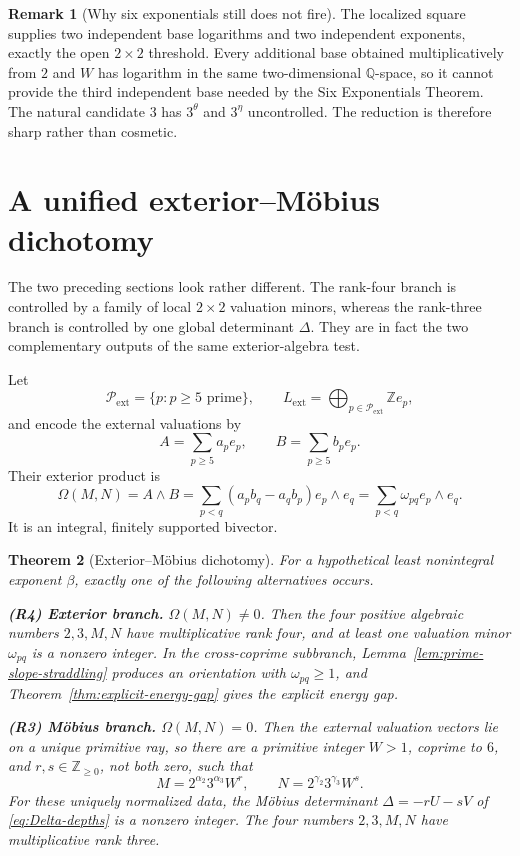 \documentclass[11pt,oneside]{article}
\theoremstyle{research}
\newtheorem{theorem}{Theorem}[section]
\theoremstyle{definition}
\newtheorem{remark}[theorem]{Remark}
\newcommand{\Q}{\mathbb Q}
\newcommand{\Z}{\mathbb Z}
\newcommand{\ext}{\mathrm{ext}}
\begin{document}
\begin{remark}[Why six exponentials still does not fire]
The localized square supplies two independent base logarithms and two
independent exponents, exactly the open $2\times2$ threshold.  Every additional
base obtained multiplicatively from $2$ and $W$ has logarithm in the same
two-dimensional $\Q$-space, so it cannot provide the third independent base
needed by the Six Exponentials Theorem.  The natural candidate $3$ has
$3^\theta$ and $3^\eta$ uncontrolled.  The reduction is therefore sharp rather
than cosmetic.
\end{remark}


\section{A unified exterior--M\"obius dichotomy}
\label{sec:branch-dichotomy}

The two preceding sections look rather different.  The rank-four branch is
controlled by a family of local $2\times2$ valuation minors, whereas the
rank-three branch is controlled by one global determinant $\Delta$.  They are
in fact the two complementary outputs of the same exterior-algebra test.

Let
\[
 \mathcal P_{\ext}=\{p:p\ge5\text{ prime}\},
 \qquad
 L_{\ext}=\bigoplus_{p\in\mathcal P_{\ext}}\Z e_p,
\]
and encode the external valuations by
\begin{equation}
 A=\sum_{p\ge5}a_pe_p,
 \qquad
 B=\sum_{p\ge5}b_pe_p.
 \label{eq:external-vectors}
\end{equation}
Their exterior product is
\begin{equation}
 \Omega(M,N)=A\wedge B
 =\sum_{p<q}(a_pb_q-a_qb_p)e_p\wedge e_q
 =\sum_{p<q}\omega_{pq}e_p\wedge e_q.
 \label{eq:omega-global}
\end{equation}
It is an integral, finitely supported bivector.

\begin{theorem}[Exterior--M\"obius dichotomy]
\label{thm:exterior-mobius-dichotomy}
For a hypothetical least nonintegral exponent $\beta$, exactly one of the
following alternatives occurs.

\smallskip
\noindent\textbf{(R4) Exterior branch.}
$\Omega(M,N)\ne0$.  Then the four positive algebraic numbers
$2,3,M,N$ have multiplicative rank four, and at least one valuation minor
$\omega_{pq}$ is a nonzero integer.  In the cross-coprime subbranch,
Lemma~\ref{lem:prime-slope-straddling} produces an orientation with
$\omega_{pq}\ge1$, and Theorem~\ref{thm:explicit-energy-gap} gives the explicit
energy gap.

\smallskip
\noindent\textbf{(R3) M\"obius branch.}
$\Omega(M,N)=0$.  Then the external valuation vectors lie on a unique
primitive ray, so there are a primitive integer $W>1$, coprime to $6$, and
$r,s\in\Z_{\ge0}$, not both zero, such that
\[
 M=2^{\alpha_2}3^{\alpha_3}W^r,
 \qquad
 N=2^{\gamma_2}3^{\gamma_3}W^s.
\]
For these uniquely normalized data, the M\"obius determinant
$\Delta=-rU-sV$ of \eqref{eq:Delta-depths} is a nonzero integer.  The four
numbers $2,3,M,N$ have multiplicative rank three.
\end{theorem}
\end{document}
